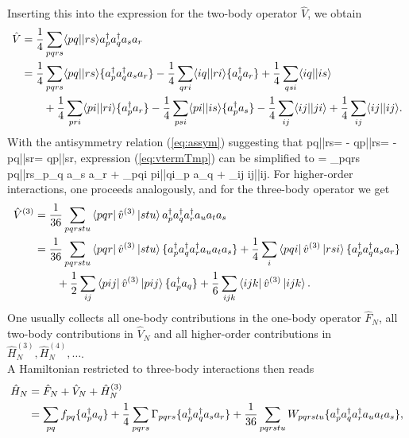 Inserting this into the expression for the two-body operator $\hat{V}$, we obtain
\begin{align}
\hat{V} &= \frac{1}{4}\sum_{pqrs} \langle pq||rs\rangle \ad_p \ad_q a_s a_r\\
&= \frac{1}{4}\sum_{pqrs} \langle pq||rs\rangle \lbrace \ad_p\ad_q a_s a_r \rbrace - \frac{1}{4}\sum_{qri} \langle iq||ri\rangle \lbrace \ad_q a_r\rbrace + \frac{1}{4}\sum_{qsi} \langle iq||is\rangle \notag \\
& \qquad + \frac{1}{4}\sum_{pri} \langle pi||ri\rangle\lbrace\ad_p a_r\rbrace - \frac{1}{4}\sum_{psi} \langle pi||is\rangle \lbrace \ad_p a_s\rbrace - \frac{1}{4}\sum_{ij} \langle ij||ji\rangle + \frac{1}{4}\sum_{ij} \langle ij||ij\rangle.
\label{eq:vtermTmp}
\end{align}
With the antisymmetry relation (\ref{eq:assym}) suggesting that
\be 
\langle pq||rs\rangle = - \langle qp||rs\rangle = - \langle pq||sr\rangle = \langle qp||sr\rangle,
\ee
expression (\ref{eq:vtermTmp}) can be simplified to
\be 
{} = \sum_{pqrs} \langle pq||rs\rangle \lbrace \ad_p\ad_q a_s a_r \rbrace + \sum_{pqi} \langle pi||qi\rangle \lbrace \ad_p a_q \rbrace + \sum_{ij} \langle ij||ij\rangle.
\label{eq:contr2}
\ee
For higher-order interactions, one proceeds analogously, and for the three-body operator we get
\begin{align}
\hat{V}^{(3)} &= \frac{1}{36}\sum_{pqrstu} \lla pqr \right|\hat{v}^{(3)}\left| stu \rra a_p\da a_q\da a_r\da a_u a_t a_s \notag \\
&= \frac{1}{36}\sum\limits_{pqrstu} \lla pqr\right|\hat{v}^{(3)}\left|stu\rra \llb a_p\da a_q\da a_r\da a_u a_t a_s\rrb + \frac{1}{4} \sum\limits_i \lla p q i \right| \hat{v}^{(3)}\left| rsi \rra \llb a_p\da a_q\da a_s a_r \rrb \notag\\
&\qquad+ \frac{1}{2}\sum\limits_{ij}\lla pij\right|\hat{v}^{(3)}\left| pij\rra \llb a_p\da a_q\rrb + \frac{1}{6}\sum\limits_{ijk}\lla ijk \right| \hat{v}^{(3)} \left| ijk \rra.
\label{eq:contr3}
\end{align}
One usually collects all one-body contributions in the one-body operator $\hat{F}_N$, all two-body contributions in $\hat{V}_N$ and all higher-order contributions in $\hat{H}_N^{(3)}, \hat{H}_N^{(4)},\dots$.\\
A Hamiltonian restricted to three-body interactions then reads 
\begin{align}
\hat{H}_N &= \hat{F}_N + \hat{V}_N + \hat{H}_N^{(3)} \notag \\
&= \sum\limits_{pq}f_{pq}\lbrace a_p^\dagger a_q\rbrace + \frac{1}{4}\sum\limits_{pqrs}\Gamma_{pqrs} \lbrace a_p^\dagger a_q^\dagger a_s a_r \rbrace + \frac{1}{36}\sum\limits_{pqrstu} W_{pqrstu} \lbrace a_p^\dagger a_q^\dagger a_r^\dagger a_u a_t a_s\rbrace ,
\end{align}
